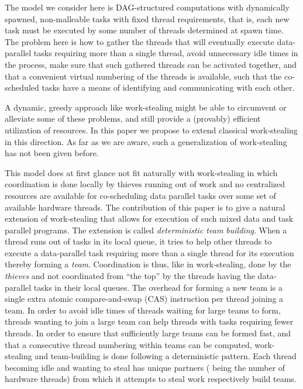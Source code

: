 \documentclass[preprint]{sigplanconf}
\begin{document}
The model we consider here is DAG-structured computations with
dynamically spawned, non-malleable tasks with fixed thread
requirements, that is, each new task must be executed by some number
of threads determined at spawn time. The problem here is how to gather
the threads that will eventually execute data-parallel tasks requiring
more than a single thread, avoid unnecessary idle times in the
process, make sure that such gathered threads can be activated
together, and that a convenient virtual numbering of the threads is
available, such that the co-scheduled tasks have a means of
identifying and communicating with each other.

A dynamic, greedy approach like work-stealing might be able to
circumvent or alleviate some of these problems, and still provide a
(provably) efficient utilization of resources.  In this paper we propose
to extend classical work-stealing in this direction. As far
as we are aware, such a generalization of work-stealing has not been
given before.

This model does at first glance not fit naturally with work-stealing
in which coordination is done locally by thieves running out of work
and no centralized resources are available for co-scheduling data
parallel tasks over some set of available hardware threads. The
contribution of this paper is to give a natural extension of
work-stealing that allows for execution of such mixed data and task
parallel programs. The extension is called \emph{deterministic team
building}. When a thread runs out of tasks in its local queue, it
tries to help other threads to execute a data-parallel task requiring
more than a single thread for its execution thereby forming a
\emph{team}. Coordination is thus, like in work-stealing, done by the
\emph{thieves} and not coordinated from ``the top'' by the threads
having the data-parallel tasks in their local queues. The overhead for
forming a new team is a single extra atomic compare-and-swap (CAS)
instruction per thread joining a team. In order to avoid idle times of
threads waiting for large teams to form, threads wanting to join a
large team can help threads with tasks requiring fewer threads. In
order to ensure that sufficiently large teams can be formed fast, and
that a consecutive thread numbering within teams can be computed,
work-stealing and team-building is done following a deterministic
pattern. Each thread becoming idle and wanting to steal has 
unique partners ( being the number of hardware threads) from which
it attempts to steal work respectively build teams.
\end{document}
